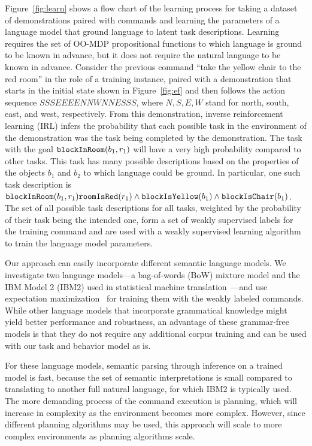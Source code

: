 \documentclass[conference]{IEEEtran}
\begin{document}
Figure~\ref{fig:learn} shows a flow chart of the learning process for taking a dataset of demonstrations paired with commands and learning the parameters of a language model that ground language to latent task descriptions. Learning requires the set of OO-MDP propositional functions to which language is ground to be known in advance, but it does not require the natural language to be known in advance. Consider the previous command ``take the yellow chair to the red room'' in the role of a training instance, paired with a demonstration that starts in the initial state shown in Figure~\ref{fig:ef} and then follows the action sequence $SSSEEEENNWNNESSS$, where $N, S, E, W$ stand for north, south, east, and west, respectively. From this demonstration, inverse reinforcement learning (IRL) infers the probability that each possible task in the environment of the demonstration was the task being completed by the demonstration. The task with the goal ${\tt blockInRoom}(b_1, r_1)$ will have a very high probability compared to other tasks. This task has many possible descriptions based on the properties of the objects $b_1$ and $b_2$ to which language could be ground. In particular, one such task description is ${\tt blockInRoom}(b_1, r_1) {\tt roomIsRed}(r_1) \land {\tt blockIsYellow}(b_1) \land {\tt blockIsChair}(b_1)$. The set of all possible task descriptions for all tasks, weighted by the probability of their task being the intended one, form a set of weakly supervised labels for the training command and are used with a weakly supervised learning algorithm to train the language model parameters.

Our approach can easily incorporate different semantic language models. We investigate two language models---a bag-of-words (BoW) mixture model and
the IBM Model 2 (IBM2) used in statistical machine translation~\cite{brown90,brown93}---and use expectation maximization~\cite{dempster77} for training them with the weakly labeled commands. While other language
models that incorporate grammatical knowledge might yield better
performance and robustness, an advantage of these grammar-free models
is that they do not require any additional corpus training and can be
used with our task and behavior model as is. 

For these language models, semantic parsing through inference on a trained model is fast, because the set of semantic interpretations is small compared to translating to another full natural language, for which IBM2 is typically used. The more demanding process of the command execution is planning, which will increase in complexity as the environment becomes more complex. However, since different planning algorithms may be used, this approach will scale to more complex environments as planning algorithms scale. 
\end{document}
